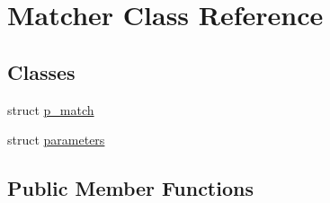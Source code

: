 \hypertarget{class_matcher}{\section{Matcher Class Reference}
\label{class_matcher}
}
\subsection*{Classes}
\begin{DoxyCompactItemize}
\item 
struct \hyperlink{struct_matcher_1_1p__match}{p\+\_\+match}
\item 
struct \hyperlink{struct_matcher_1_1parameters}{parameters}
\end{DoxyCompactItemize}
\subsection*{Public Member Functions}
